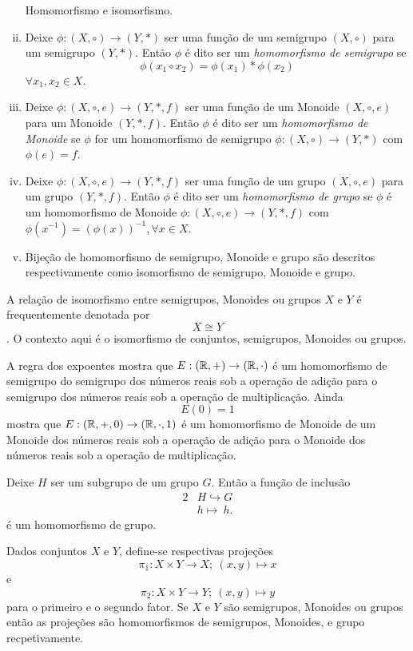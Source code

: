 \begin{definition}
  \begin{enumerate}[i.]
    Homomorfismo e isomorfismo.
    \item Deixe $\phi: (X, \circ) \to (Y, *)$ ser uma função de um semigrupo $(X, \circ)$ para um semigrupo $(Y,*)$. Então $\phi$ é dito ser um \emph{homomorfismo de semigrupo} se $$\phi(x_{1}\circ x_{2}) = \phi(x_{1}) * \phi(x_{2})$$ $\forall x_{1},x_{2} \in X$.
    \item Deixe $\phi: (X,\circ, e) \to (Y, *, f)$ ser uma função de um Monoide $(X, \circ , e)$ para um Monoide $(Y, *, f)$. Então $\phi$ é dito ser um \emph{homomorfismo de Monoide} se $\phi$ for um homomorfismo de semigrupo $\phi: (X,\circ) \to (Y,*)$ com $\phi(e) = f$.
    \item Deixe $\phi: (X,\circ , e) \to (Y, *, f)$ ser uma função de um grupo $(X,\circ, e)$ para um grupo $(Y, *, f)$. Então $\phi$ é dito ser um \emph{homomorfismo de grupo} se $\phi$ é um homomorfismo de Monoide $\phi: (X,\circ, e) \to (Y, *, f)$ com $\phi(x^{-1}) = (\phi(x))^{-1}, \forall x \in X$.
    \item Bijeção de homomorfismo de semigrupo, Monoide e grupo são descritos respectivamente como isomorfismo de semigrupo, Monoide e grupo.
  \end{enumerate}
  
\end{definition}
A relação de isomorfismo entre semigrupos, Monoides ou grupos $X$ e $Y$ é frequentemente denotada por $$X\cong Y$$. O contexto aqui é o isomorfismo de conjuntos, semigrupos, Monoides ou grupos.

\begin{exmp}
  A regra dos expoentes mostra que $E: (\mathbb{R}, +) \to (\mathbb{R},\cdot)$ é um homomorfismo de semigrupo do semigrupo dos números reais sob a operação de adição para o semigrupo dos números reais sob a operação de multiplicação. Ainda $$E(0)=1$$ mostra que $E: (\mathbb{R},+,0) \to (\mathbb{R},\cdot,1)$ é um homomorfismo de Monoide de um Monoide dos números reais sob a operação de adição para o Monoide dos números reais sob a operação de multiplicação.
\end{exmp}
\begin{exmp}
  Deixe $H$ ser um subgrupo de um grupo $G$. Então a função de inclusão
  \begin{alignat}{2}
    &H \hookrightarrow G \nonumber\\
    &h \mapsto\ h.
    \nonumber
  \end{alignat}
  é um homomorfismo de grupo.
\end{exmp}
\begin{exmp}
  Dados conjuntos $X$ e $Y$, define-se respectivas projeções
  $$\pi_{1}: X\times Y \to X;\ (x,y)\mapsto x$$ e $$\pi_{2}: X\times Y \to Y;\ (x,y)\mapsto y$$
  para o primeiro e o segundo fator. Se $X$ e $Y$ são semigrupos, Monoides ou grupos então as projeções são homomorfismos de semigrupos, Monoides, e grupo recpetivamente.
\end{exmp}

